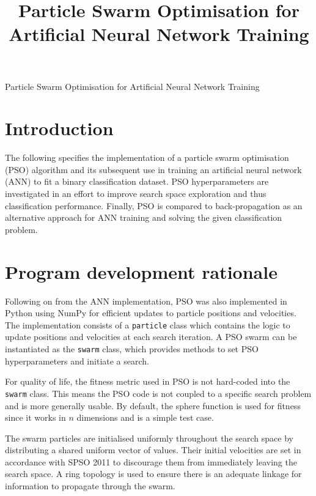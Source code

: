 \documentclass[12pt]{article}
\begin{document}
\title{Particle Swarm Optimisation for Artificial Neural Network Training}

\begin{center}
  \Large{Particle Swarm Optimisation for Artificial Neural Network Training}
\end{center}

\vspace{-2em}
\section{Introduction}
\vspace{-1.5em}

The following specifies the implementation of a particle swarm
optimisation (PSO) algorithm and its subsequent use in training an
artificial neural network (ANN) to fit a binary classification dataset.
PSO hyperparameters are investigated in an effort to improve search
space exploration and thus classification performance. Finally, PSO is
compared to back-propagation as an alternative approach for ANN training
and solving the given classification problem.

\vspace{-1.5em}
\section{Program development rationale}
\vspace{-1.5em}

Following on from the ANN implementation, PSO was also implemented in
Python using NumPy for efficient updates to particle positions and velocities.
The implementation consists of a \texttt{particle} class which contains
the logic to update positions and velocities at each search iteration.
A PSO swarm can be instantiated as the \texttt{swarm} class, which provides
methods to set PSO hyperparameters and initiate a search.

For quality of life, the fitness metric used in PSO is not hard-coded
into the \texttt{swarm} class. This means the PSO code is not coupled to
a specific search problem and is more generally usable. By default, the
sphere function is used for fitness since it works in \(n\) dimensions
and is a simple test case.

The swarm particles are initialised uniformly throughout the search space
by distributing a shared uniform vector of values. Their initial velocities
are set in accordance with SPSO 2011 \cite{Clerc} to discourage them from
immediately leaving the search space. A ring topology \cite{Clerc} is used to
ensure there is an adequate linkage for information to propagate through
the swarm.
\end{document}
